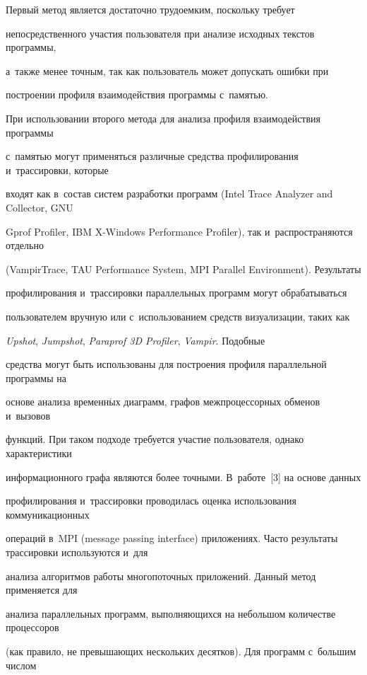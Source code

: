      Первый метод является достаточно трудоемким, поскольку требует


непосредственного участия пользователя при анализе исходных текстов программы,


      а~так\-же менее точным, так как пользователь может допускать ошибки при


по\-стро\-ении профиля взаимодействия программы с~па\-мятью.





      При использовании второго метода для анализа профиля взаимодействия программы


с~памятью могут применяться различные средства профилирования и~трассировки, которые


входят как в~со\-став сис\-тем разработки программ (Intel Trace Analyzer and Collector, GNU


Gprof Profiler, IBM X-Windows Performance Profiler), так и~распространяются отдельно


(VampirTrace, TAU Performance System, MPI Parallel Environment). Результаты


профилирования и~трассировки параллельных программ могут обрабатываться


пользователем вручную или с~использованием средств визуализации, таких как


\textit{Upshot}, \textit{Jumpshot}, \textit{Paraprof 3D Profiler}, \textit{Vampir}. Подобные


средства могут быть использованы для по\-стро\-ения профиля параллельной программы на


основе анализа временн$\acute{\mbox{ы}}$х диаграмм, графов межпроцессорных обменов и~вызовов


функций. При таком подходе требуется участие пользователя, однако характеристики


информационного графа являются более точными. В~работе~[3] на основе данных


профилирования и~трассировки проводилась оценка использования коммуникационных


операций в~MPI (message passing interface) при\-ло\-же\-ни\-ях. Часто результаты трассировки используются и~для


анализа алгоритмов работы многопоточных приложений. Данный метод применяется для


анализа параллельных программ, выполняющихся на небольшом количестве процессоров


(как правило, не превышающих нескольких десятков). Для программ с~большим числом


